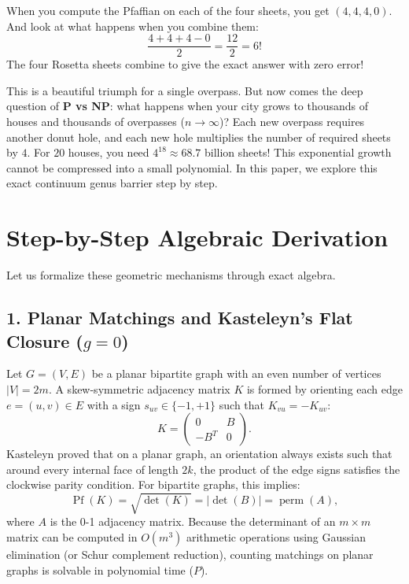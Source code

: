 \documentclass[11pt,a4paper]{article}
\theoremstyle{definition}
\begin{document}
When you compute the Pfaffian on each of the four sheets, you get $(4, 4, 4, 0)$. And look at what happens when you combine them:
\begin{equation}
\frac{4 + 4 + 4 - 0}{2} = \frac{12}{2} = 6!
\end{equation}
The four Rosetta sheets combine to give the exact answer with zero error!

This is a beautiful triumph for a single overpass. But now comes the deep question of \textbf{P vs NP}: what happens when your city grows to thousands of houses and thousands of overpasses ($n \to \infty$)? Each new overpass requires another donut hole, and each new hole multiplies the number of required sheets by $4$. For $20$ houses, you need $4^{18} \approx 68.7$ billion sheets! This exponential growth cannot be compressed into a small polynomial. In this paper, we explore this exact continuum genus barrier step by step.


\section{Step-by-Step Algebraic Derivation}

Let us formalize these geometric mechanisms through exact algebra.

\subsection{1. Planar Matchings and Kasteleyn's Flat Closure ($g = 0$)}
Let $G = (V, E)$ be a planar bipartite graph with an even number of vertices $|V| = 2m$. A skew-symmetric adjacency matrix $K$ is formed by orienting each edge $e = (u, v) \in E$ with a sign $s_{uv} \in \{-1, +1\}$ such that $K_{vu} = -K_{uv}$:
\begin{equation}
K = \begin{pmatrix} 0 & B \\ -B^T & 0 \end{pmatrix}.
\end{equation}
Kasteleyn proved that on a planar graph, an orientation always exists such that around every internal face of length $2k$, the product of the edge signs satisfies the clockwise parity condition. For bipartite graphs, this implies:
\begin{equation}
\operatorname{Pf}(K) = \sqrt{\det(K)} = |\det(B)| = \operatorname{perm}(A),
\end{equation}
where $A$ is the 0-1 adjacency matrix. Because the determinant of an $m \times m$ matrix can be computed in $O(m^3)$ arithmetic operations using Gaussian elimination (or Schur complement reduction), counting matchings on planar graphs is solvable in polynomial time ($P$).
\end{document}
